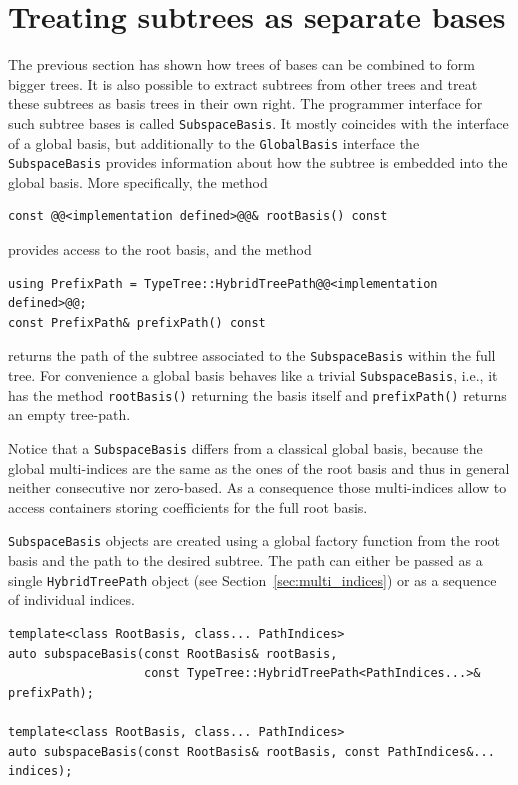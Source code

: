 \documentclass[a4paper,10pt,headings=normal,bibliography=totoc]{scrartcl}
\newcommand{\cpp}[1]{\lstinline[basicstyle=\ttfamily]!#1!}
\begin{document}
\section{Treating subtrees as separate bases}

The previous section has shown how trees of bases can be combined to form
bigger trees.  It is also possible to extract subtrees from other trees
and treat these subtrees as basis trees in their own right.
The programmer interface for such subtree bases is called \cpp{SubspaceBasis}.
It mostly coincides with the interface of a global basis, but additionally
to the \cpp{GlobalBasis} interface the \cpp{SubspaceBasis} provides
information about how the subtree is embedded into the global basis.
More specifically, the method
\begin{lstlisting}[style=Interface]
const @@<implementation defined>@@& rootBasis() const
\end{lstlisting}
provides access to the root basis, and the method
\begin{lstlisting}[style=Interface]
using PrefixPath = TypeTree::HybridTreePath@@<implementation defined>@@;
const PrefixPath& prefixPath() const
\end{lstlisting}
returns the
path of the subtree associated to the \cpp{SubspaceBasis}
within the full tree.
For convenience a global basis behaves like a trivial \cpp{SubspaceBasis},
i.e., it has the method \cpp{rootBasis()} returning the basis itself
and \cpp{prefixPath()} returns an empty tree-path.

Notice that a \cpp{SubspaceBasis} differs from a classical
global basis, because the global multi-indices are the
same as the ones of the root basis and thus in general
neither consecutive nor zero-based. As a consequence those multi-indices
allow to access containers storing coefficients for the
full root basis.

\cpp{SubspaceBasis} objects are created using a global
factory function from the root basis and the path
to the desired subtree. The path can either be passed
as a single \cpp{HybridTreePath} object (see Section~\ref{sec:multi_indices}) or
as a sequence of individual indices.

\begin{lstlisting}[style=Interface]
template<class RootBasis, class... PathIndices>
auto subspaceBasis(const RootBasis& rootBasis,
                   const TypeTree::HybridTreePath<PathIndices...>& prefixPath);

template<class RootBasis, class... PathIndices>
auto subspaceBasis(const RootBasis& rootBasis, const PathIndices&... indices);
\end{lstlisting}
\end{document}
